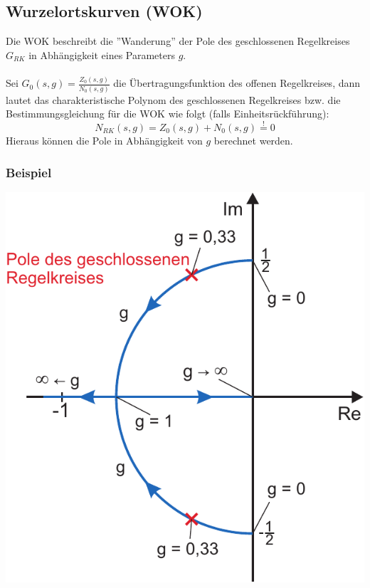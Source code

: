 \documentclass[a4paper,twocolumn,10pt]{article}
\newcommand{\sollsein}{\stackrel{!}{=}}
\begin{document}
\subsection{Wurzelortskurven (WOK)}
Die WOK beschreibt die ''Wanderung'' der Pole des geschlossenen Regelkreises $G_{RK}$ in Abhängigkeit eines Parameters $g$.\\\\
Sei $G_0(s,g)=\frac{Z_0(s,g)}{N_0(s,g)}$ die Übertragungsfunktion des offenen Regelkreises, dann lautet das charakteristische Polynom des geschlossenen Regelkreises bzw. die Bestimmungsgleichung für die WOK wie folgt (falls Einheitsrückführung):
\begin{equation*}
N_{RK}(s,g)=Z_0(s,g)+N_0(s,g)\sollsein 0
\end{equation*}
Hieraus können die Pole in Abhängigkeit von $g$ berechnet werden.

\subsubsection{Beispiel}
\begin{center}
\includegraphics[width=0.8\columnwidth]{Grafiken/WOK_Beispiel}
\end{center}
\end{document}
